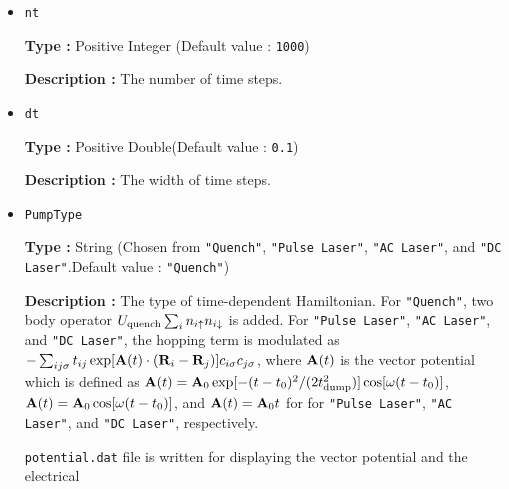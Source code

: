 \begin{itemize}

\item \verb|nt|

  {\bf Type :} Positive Integer (Default value : \verb|1000|)
  
  {\bf Description :} The number of time steps.

\item \verb|dt|
  
  {\bf Type :} Positive Double(Default value : \verb|0.1|)
  
  {\bf Description :} The width of time steps.

\item \verb|PumpType|
  
  {\bf Type :} String (Chosen from \verb|"Quench"|, \verb|"Pulse Laser"|,
  \verb|"AC Laser"|, and \verb|"DC Laser"|.Default value : \verb|"Quench"|)

  {\bf Description :} The type of time-dependent Hamiltonian.
  For \verb|"Quench"|, two body operator 
  $U_{\rm quench} \sum_i n_{i \uparrow} n_{i \downarrow}$ is added.
  For \verb|"Pulse Laser"|, \verb|"AC Laser"|, and \verb|"DC Laser"|,
  the hopping term is modulated as
  $-\sum_{i j \sigma} t_{i j} \exp[{\bf A}(t) \cdot ({\bf R}_i-{\bf R}_j)] c_{i \sigma} c_{j \sigma}$,
  where ${\bf A}(t)$ is the vector potential which is defined as
  ${\bf A}(t) = {\bf A}_0 \exp[-(t-t_0)^2/(2 t_{\rm dump}^2)] \cos[\omega (t-t_0)]$,
  ${\bf A}(t) = {\bf A}_0 \cos[\omega (t-t_0)]$, and
  ${\bf A}(t) = {\bf A}_0 t$ for
  for \verb|"Pulse Laser"|,
  \verb|"AC Laser"|, and
  \verb|"DC Laser"|, respectively.

  \verb|potential.dat| file is written for displaying the vector potential
  and the electrical
\end{itemize}
